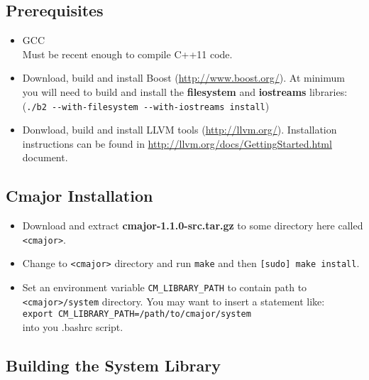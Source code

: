 \documentclass[oneside, a4paper, 11pt]{article}
\begin{document}
\subsection{Prerequisites}

\begin{itemize}

\item
GCC\\
Must be recent enough to compile C++11 code.

\item
Download, build and install Boost (\url{http://www.boost.org/}).
At minimum you will need to build and install the
\textbf{filesystem} and \textbf{iostreams} libraries:\\
(\verb|./b2 --with-filesystem --with-iostreams install|)

\item
Donwload, build and install LLVM tools (\url{http://llvm.org/}).
Installation instructions can be found in \url{http://llvm.org/docs/GettingStarted.html} document.

\end{itemize}

\subsection{Cmajor Installation}

\begin{itemize}

\item
Download and extract \textbf{cmajor-1.1.0-src.tar.gz} to some directory here called \verb|<cmajor>|.

\item
Change to \verb|<cmajor>| directory and run \verb|make| and then \verb|[sudo] make install|.

\item
Set an environment variable \verb|CM_LIBRARY_PATH| to contain path to \verb|<cmajor>/system| directory.
You may want to insert a statement like:\\
\verb|export CM_LIBRARY_PATH=/path/to/cmajor/system|\\
into you .bashrc script.

\end{itemize}

\subsection{Building the System Library}
\end{document}

